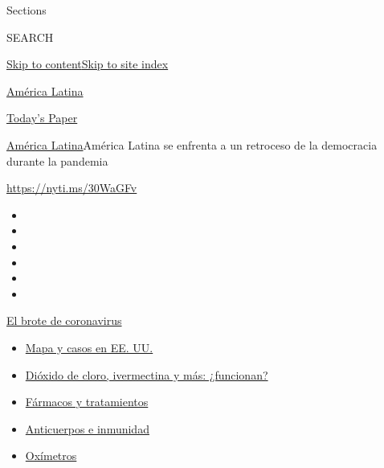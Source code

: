 Sections

SEARCH

\protect\hyperlink{site-content}{Skip to
content}\protect\hyperlink{site-index}{Skip to site index}

\href{https://www.nytimes.com/es/section/america-latina}{América Latina}

\href{https://myaccount.nytimes.com/auth/login?response_type=cookie\&client_id=vi}{}

\href{https://www.nytimes.com/section/todayspaper}{Today's Paper}

\href{/es/section/america-latina}{América Latina}\textbar{}América
Latina se enfrenta a un retroceso de la democracia durante la pandemia

\url{https://nyti.ms/30WaGFv}

\begin{itemize}
\item
\item
\item
\item
\item
\item
\end{itemize}

\href{https://www.nytimes.com/es/spotlight/coronavirus?action=click\&pgtype=Article\&state=default\&region=TOP_BANNER\&context=storylines_menu}{El
brote de coronavirus}

\begin{itemize}
\tightlist
\item
  \href{https://www.nytimes.com/es/interactive/2020/espanol/mundo/coronavirus-en-estados-unidos.html?action=click\&pgtype=Article\&state=default\&region=TOP_BANNER\&context=storylines_menu}{Mapa
  y casos en EE. UU.}
\item
  \href{https://www.nytimes.com/es/2020/07/23/espanol/america-latina/bolivia-cloro-coronavirus-ivermectina.html?action=click\&pgtype=Article\&state=default\&region=TOP_BANNER\&context=storylines_menu}{Dióxido
  de cloro, ivermectina y más: ¿funcionan?}
\item
  \href{https://www.nytimes.com/es/interactive/2020/science/coronavirus-tratamientos-curas.html?action=click\&pgtype=Article\&state=default\&region=TOP_BANNER\&context=storylines_menu}{Fármacos
  y tratamientos}
\item
  \href{https://www.nytimes.com/es/2020/07/28/espanol/ciencia-y-tecnologia/anticuerpos-coronavirus-inmunidad.html?action=click\&pgtype=Article\&state=default\&region=TOP_BANNER\&context=storylines_menu}{Anticuerpos
  e inmunidad}
\item
  \href{https://www.nytimes.com/es/2020/04/29/espanol/estilos-de-vida/oximetro-para-que-sirve.html?action=click\&pgtype=Article\&state=default\&region=TOP_BANNER\&context=storylines_menu}{Oxímetros}
\end{itemize}

